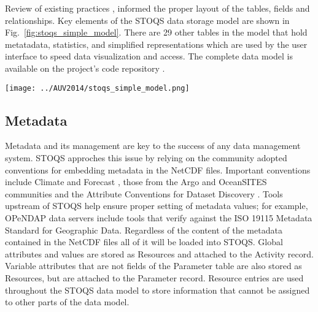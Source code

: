\documentclass[conference]{IEEEtran}
\begin{document}
Review of existing practices \cite{Wright}, \cite{MODB} informed the proper layout 
of the tables, fields and relationships.  Key elements of the STOQS data storage model 
are shown in Fig.~\ref{fig:stoqs_simple_model}. There are 29 other tables in the model 
that hold metatadata, statistics, and simplified representations which are used by 
the user interface to speed data visualization and access. The complete data model 
is available on the project's code repository \cite{STOQS}. 

\begin{figure*}[htbp]
\centering
\texttt{[image: ../AUV2014/stoqs\_simple\_model.png]}
\caption{Key elements of the STOQS database schema where spatial, temporal, and data 
values are stored. The database is normalized for efficient storage of data such 
that data are not repeated in any of the tables. Temporal and spatial data are stored 
separately in the InstantPoint and Measurement/Sample tables. For trajectory and 
timeseries data there is a one-to-one relationship for records in InstantPoint and 
Measurement/Sample. For timeseriesProfile and trajecotryProfile feature type data 
there are multiple Measurement/Sample records for each InstantPoint record. 
Parameter names are stored as records in the Parameter table allowing for new 
parameters without schema modification.}
\label{fig:stoqs_simple_model}
\end{figure*}

\subsection{Metadata}

Metadata and its management are key to the success of any data management system. 
STOQS approches this issue by relying on the community adopted conventions for 
embedding metadata in the NetCDF files. Important conventions include Climate and 
Forecast \cite{CF}, those from the Argo and OceanSITES communities \cite{Pouliquen2006} 
and the Attribute Conventions for Dataset Discovery \cite{ACDD}. Tools upstream 
of STOQS help ensure proper setting of metadata values; for example, OPeNDAP data 
servers include tools that verify against the ISO 19115 Metadata Standard for 
Geographic Data. Regardless of the content of the metadata contained in the NetCDF 
files all of it will be loaded into STOQS. Global attributes and values are stored 
as Resources and attached to the Activity record. Variable attributes that are not 
fields of the Parameter table are also stored as Resources, but are attached to the 
Parameter record. Resource entries are used throughout the STOQS data model to store 
information that cannot be assigned to other parts of the data model.
\end{document}
